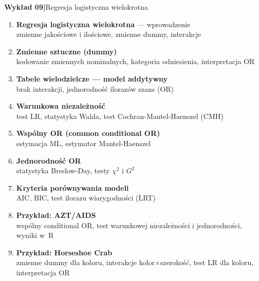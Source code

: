 \documentclass[a4paper,11pt]{article}
\begin{document}
\begin{mdframed}[
  backgroundcolor=lightblue,
  linecolor=borderblue,
  linewidth=0.8pt,
  innerleftmargin=10pt,
  innerrightmargin=10pt,
  innertopmargin=6pt,
  innerbottommargin=6pt,
  roundcorner=4pt
]
  \textbf{\color{accentblue}Wykład 09\quad|\quad}{\color{darkgray}Regresja logistyczna wielokrotna}
\end{mdframed}

\vspace{0.4em}
\begin{enumerate}[label=\textbf{\arabic*.}, leftmargin=1.8em, itemsep=3pt, topsep=2pt]
  \item \textbf{Regresja logistyczna wielokrotna} --- wprowadzenie\\
        {\small\color{medgray}zmienne jakościowe i ilościowe, zmienne dummy, interakcje}
  \item \textbf{Zmienne sztuczne (dummy)}\\
        {\small\color{medgray}kodowanie zmiennych nominalnych, kategoria odniesienia, interpretacja OR}
  \item \textbf{Tabele wielodzielcze --- model addytywny}\\
        {\small\color{medgray}brak interakcji, jednorodność ilorazów szans (OR)}
  \item \textbf{Warunkowa niezależność}\\
        {\small\color{medgray}test LR, statystyka Walda, test Cochran-Mantel-Haenszel (CMH)}
  \item \textbf{Wspólny OR (common conditional OR)}\\
        {\small\color{medgray}estymacja ML, estymator Mantel-Haenszel}
  \item \textbf{Jednorodność OR}\\
        {\small\color{medgray}statystyka Breslow-Day, testy $\chi^2$ i $G^2$}
  \item \textbf{Kryteria porównywania modeli}\\
        {\small\color{medgray}AIC, BIC, test ilorazu wiarygodności (LRT)}
  \item \textbf{Przykład: AZT/AIDS}\\
        {\small\color{medgray}wspólny conditional OR, test warunkowej niezależności i jednorodności, wyniki w~R}
  \item \textbf{Przykład: Horseshoe Crab}\\
        {\small\color{medgray}zmienne dummy dla koloru, interakcje kolor$\times$szerokość, test LR dla koloru, interpretacja OR}
\end{enumerate}
\end{document}
